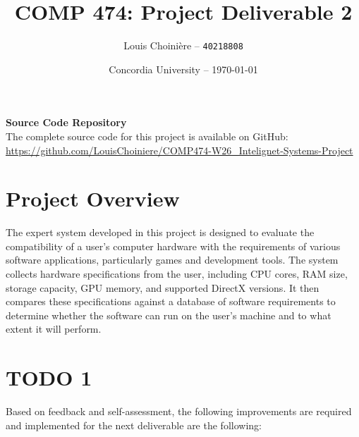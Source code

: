 \documentclass{article}
\title{COMP 474: Project Deliverable 2}
\author{Louis Choinière -- \texttt{40218808}}
\date{Concordia University -- \today}
\begin{document}
\maketitle %

\noindent\textbf{Source Code Repository}\\
The complete source code for this project is available on GitHub:
\url{https://github.com/LouisChoiniere/COMP474-W26_Intelignet-Systems-Project}



\section*{Project Overview}

The expert system developed in this project is designed to evaluate the compatibility of a user's computer hardware with the requirements of various software applications, particularly games and development tools. The system collects hardware specifications from the user, including CPU cores, RAM size, storage capacity, GPU memory, and supported DirectX versions. It then compares these specifications against a database of software requirements to determine whether the software can run on the user's machine and to what extent it will perform.

\section*{TODO 1}

Based on feedback and self-assessment, the following improvements are required and implemented for the next deliverable are the following:
\end{document}
